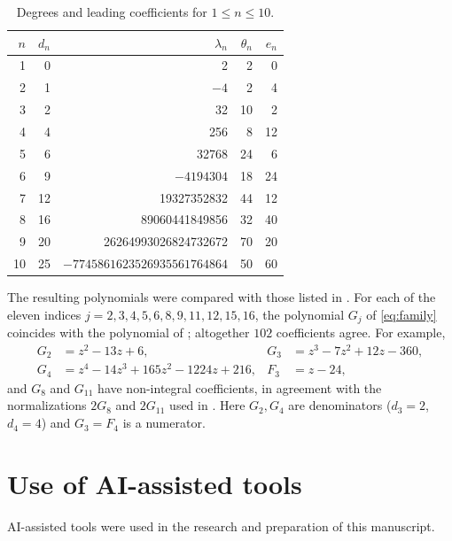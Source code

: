 \documentclass[11pt]{amsart}
\theoremstyle{remark}
\numberwithin{equation}{section}
\begin{document}
\begin{table}[ht]
\caption{Degrees and leading coefficients for $1\le n\le10$.}\label{tab:leading}
\begin{tabular}{rrrrr}
\toprule
$n$ & $d_n$ & $\lambda_n$ & $\theta_n$ & $e_n$\\
\midrule
1 & 0 & 2 & 2 & 0\\
2 & 1 & $-4$ & 2 & 4\\
3 & 2 & 32 & 10 & 2\\
4 & 4 & 256 & 8 & 12\\
5 & 6 & 32768 & 24 & 6\\
6 & 9 & $-4194304$ & 18 & 24\\
7 & 12 & 19327352832 & 44 & 12\\
8 & 16 & 89060441849856 & 32 & 40\\
9 & 20 & 26264993026824732672 & 70 & 20\\
10 & 25 & $-7745861623526935561764864$ & 50 & 60\\
\bottomrule
\end{tabular}
\end{table}

The resulting polynomials were compared with those listed in \cite[Appendix~C(4)]{LZ}. For each of the eleven indices $j=2,3,4,5,6,8,9,11,12,15,16$, the polynomial $G_j$ of \eqref{eq:family} coincides with the polynomial of \cite{LZ}; altogether $102$ coefficients agree. For example,
\begin{align*}
G_2&=z^2-13z+6, & G_3&=z^3-7z^2+12z-360,\\
G_4&=z^4-14z^3+165z^2-1224z+216, & F_3&=z-24,
\end{align*}
and $G_8$ and $G_{11}$ have non-integral coefficients, in agreement with the normalizations $2G_8$ and $2G_{11}$ used in \cite[Appendix~C(4)]{LZ}. Here $G_2,G_4$ are denominators ($d_3=2$, $d_4=4$) and $G_3=F_4$ is a numerator.

\section*{Use of AI-assisted tools}

AI-assisted tools were used in the research and preparation of this manuscript.
\end{document}
